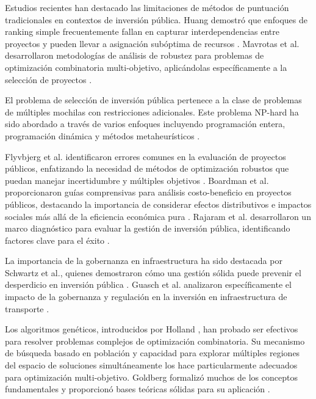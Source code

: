 \documentclass[12pt,a4paper]{article}
\begin{document}
Estudios recientes han destacado las limitaciones de métodos de puntuación tradicionales en contextos de inversión pública. Huang demostró que enfoques de ranking simple frecuentemente fallan en capturar interdependencias entre proyectos y pueden llevar a asignación subóptima de recursos \cite{huang2007}. Mavrotas et al. desarrollaron metodologías de análisis de robustez para problemas de optimización combinatoria multi-objetivo, aplicándolas específicamente a la selección de proyectos \cite{mavrotas2008}.

\vspace{0.5cm}
\vspace{0.3cm}

El problema de selección de inversión pública pertenece a la clase de problemas de múltiples mochilas con restricciones adicionales. Este problema NP-hard ha sido abordado a través de varios enfoques incluyendo programación entera, programación dinámica y métodos metaheurísticos \cite{garey1979,kellerer2004}.

Flyvbjerg et al. identificaron errores comunes en la evaluación de proyectos públicos, enfatizando la necesidad de métodos de optimización robustos que puedan manejar incertidumbre y múltiples objetivos \cite{flyvbjerg2002}. Boardman et al. proporcionaron guías comprensivas para análisis costo-beneficio en proyectos públicos, destacando la importancia de considerar efectos distributivos e impactos sociales más allá de la eficiencia económica pura \cite{boardman2017}. Rajaram et al. desarrollaron un marco diagnóstico para evaluar la gestión de inversión pública, identificando factores clave para el éxito \cite{rajaram2005}.

La importancia de la gobernanza en infraestructura ha sido destacada por Schwartz et al., quienes demostraron cómo una gestión sólida puede prevenir el desperdicio en inversión pública \cite{schwartz2020}. Guasch et al. analizaron específicamente el impacto de la gobernanza y regulación en la inversión en infraestructura de transporte \cite{guasch2014}.

\vspace{0.5cm}
\vspace{0.3cm}

Los algoritmos genéticos, introducidos por Holland \cite{holland1975}, han probado ser efectivos para resolver problemas complejos de optimización combinatoria. Su mecanismo de búsqueda basado en población y capacidad para explorar múltiples regiones del espacio de soluciones simultáneamente los hace particularmente adecuados para optimización multi-objetivo. Goldberg formalizó muchos de los conceptos fundamentales y proporcionó bases teóricas sólidas para su aplicación \cite{goldberg1989}.
\end{document}
